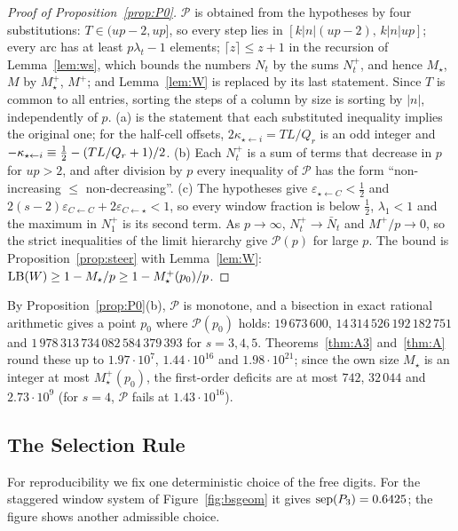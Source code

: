 \begin{proof}[Proof of Proposition~\ref{prop:P0}]
$\mathcal P$ is obtained from the hypotheses by four substitutions: $T\in(up-2,up]$, so every step lies in $[k|n|(up-2),\,k|n|up]$; every arc has at least $p\lambda_t-1$ elements; $\lceil z\rceil\le z+1$ in the recursion of Lemma~\ref{lem:ws}, which bounds the numbers $N_t$ by the sums $N_t^+$, and hence $M_\star$, $M$ by $M_\star^+$, $M^+$; and Lemma~\ref{lem:W} is replaced by its last statement. Since $T$ is common to all entries, sorting the steps of a column by size is sorting by $|n|$, independently of $p$. (a) is the statement that each substituted inequality implies the original one; for the half-cell offsets, $2\kappa_{\star\leftarrow i}=TL/Q_r$ is an odd integer and $-\kappa_{\star\leftarrow i}\equiv\tfrac12-(TL/Q_r+1)/2$. (b) Each $N_t^+$ is a sum of terms that decrease in $p$ for $up>2$, and after division by $p$ every inequality of $\mathcal P$ has the form ``non-increasing $\le$ non-decreasing''. (c) The hypotheses give $\varepsilon_{\star\leftarrow C}<\frac12$ and $2(s-2)\varepsilon_{C\leftarrow C}+2\varepsilon_{C\leftarrow\star}<1$, so every window fraction is below $\frac12$, $\lambda_1<1$ and the maximum in $N_1^+$ is its second term. As $p\to\infty$, $N_t^+\to\bar N_t$ and $M^+/p\to0$, so the strict inequalities of the limit hierarchy give $\mathcal P(p)$ for large $p$. The bound is Proposition~\ref{prop:steer} with Lemma~\ref{lem:W}: $\mathrm{LB}(W)\ge1-M_\star/p\ge1-M_\star^+(p_0)/p$.
\end{proof}

By Proposition~\ref{prop:P0}(b), $\mathcal P$ is monotone, and a bisection in exact rational arithmetic gives a point $p_0$ where $\mathcal P(p_0)$ holds: $19\,673\,600$, $14\,314\,526\,192\,182\,751$ and $1\,978\,313\,734\,082\,584\,379\,393$ for $s=3,4,5$. Theorems~\ref{thm:A3} and~\ref{thm:A} round these up to $1.97\cdot10^7$, $1.44\cdot10^{16}$ and $1.98\cdot10^{21}$; since the own size $M_\star$ is an integer at most $M_\star^+(p_0)$, the first-order deficits are at most $742$, $32\,044$ and $2.73\cdot10^9$ (for $s=4$, $\mathcal P$ fails at $1.43\cdot10^{16}$).

\subsection{The Selection Rule}\label{app:steerrule}
For reproducibility we fix one deterministic choice of the free digits. For the staggered window system of Figure~\ref{fig:bsgeom} it gives $\operatorname{sep}(P_3)=0.6425$; the figure shows another admissible choice.

